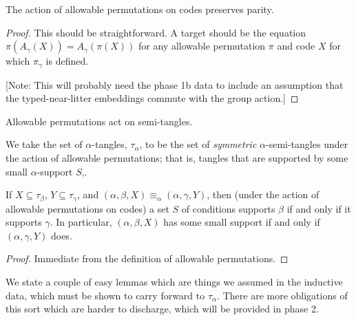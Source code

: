 \begin{lemma}
\label{lem:parity-action}
\leanok
The action of allowable permutations on codes preserves parity.
\end{lemma}

\begin{proof}
This should be straightforward.  A target should be the equation $\pi(A_\gamma(X)) = A_\gamma(\pi(X))$ for any allowable permutation $\pi$ and code $X$ for which $\pi_\gamma$ is defined.

[Note: This will probably need the phase 1b data to include an assumption that the typed-near-litter embeddings commute with the group action.]
\end{proof}

\begin{definition}
\label{def:semi-tangle-action}
  Allowable permutations act on semi-tangles.
\end{definition}

\begin{definition}
\label{def:tangle}
\leanok
We take the set of $\alpha$-tangles, $\tau_\alpha$, to be the set of \emph{symmetric} $\alpha$-semi-tangles under the action of allowable permutations; that is, tangles that are supported by some small $\alpha$-support $S$,.
\end{definition}

\begin{lemma}
\label{lem:supportedness-equiv}
\leanok
If $X \subseteq \tau_\beta$, $Y \subseteq \tau_\gamma$, and $(\alpha,\beta,X) \equiv_\alpha (\alpha,\gamma,Y)$, then (under the action of allowable permutations on codes) a set $S$ of conditions supports $\beta$ if and only if it supports $\gamma$.  In particular,  $(\alpha,\beta,X)$ has some small support if and only if $(\alpha,\gamma,Y)$ does.
\end{lemma}

\begin{proof}
\leanok
  Immediate from the definition of allowable permutations.
\end{proof}

We state a couple of easy lemmas which are things we assumed in the inductive data, which must be shown to carry forward to $\tau_\alpha$.  There are more obligations of this sort which are harder to discharge, which will be provided in phase 2.

